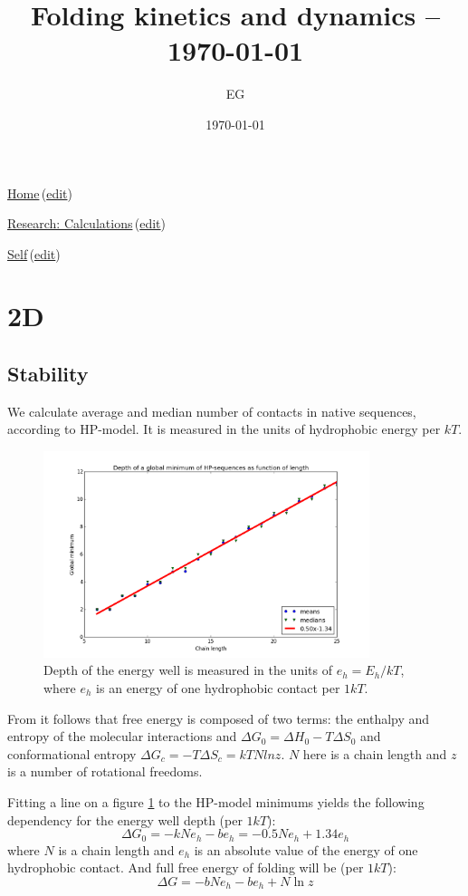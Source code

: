\documentclass[12pt]{paper}
\title{Folding kinetics and dynamics -- \today}
\author{EG}
\date{\today}
\newcommand{\gD}{\Delta}
\newcommand{\wikilink}[2] { \href{#1.pdf}{#2}\,(\href{#1.tex}{edit})}
\begin{document}
 \maketitle
\wikilink{home}{Home}

\wikilink{research\_calculations}{Research: Calculations}

\wikilink{folding\_kinetics\_and\_dynamics}{Self}

\section{2D}
\subsection{Stability}\label{sec:stability}
We  calculate average and median number of contacts in native sequences, according to 
HP-model. It is measured in the units of hydrophobic energy per $kT$.
\begin{figure}[h!]
  \centering
  \includegraphics[width=0.85\textwidth]{pictures/hp-depth-length.png} 
  \caption{Depth of the energy well is measured in the units of $e_h=E_h/kT$, where $e_h$ is an 
energy of one hydrophobic contact per $1kT$.}
  \label{fig:hp-depth-length}
\end{figure}
From \cite{Ghosh2009} it follows that free energy is composed of two terms: the enthalpy and 
entropy of the molecular interactions and $\gD G_0=\gD H_0-T\gD S_0$ and conformational entropy 
$\gD G_c=-T\gD S_c=kTN ln z$. $N$ here is a chain length and $z$ is a number of rotational 
freedoms.

Fitting a line on a figure \ref{fig:hp-depth-length} to the HP-model minimums yields the following 
dependency for the energy well depth (per $1kT$):
\begin{equation}
\gD G_0= -kNe_h-be_h= -0.5Ne_h +1.34e_h
\end{equation} 
where $N$ is a chain length and $e_h$ is an absolute value of the energy 
of one hydrophobic contact.
And full free energy of folding will be (per $1kT$):
\begin{equation}
 \gD G = -bNe_h -be_h+N\ln z
\end{equation} 
\end{document}
